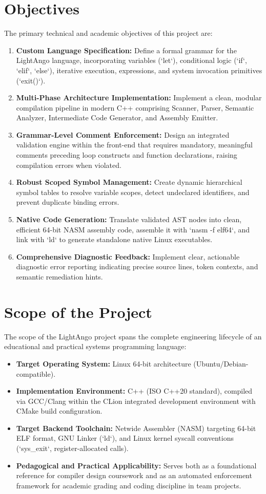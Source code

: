 \section{Objectives}
The primary technical and academic objectives of this project are:
\begin{enumerate}
    \item \textbf{Custom Language Specification:} Define a formal grammar for the LightAngo language, incorporating variables (`let`), conditional logic (`if`, `elif`, `else`), iterative execution, expressions, and system invocation primitives (`exit()`).
    \item \textbf{Multi-Phase Architecture Implementation:} Implement a clean, modular compilation pipeline in modern C++ comprising Scanner, Parser, Semantic Analyzer, Intermediate Code Generator, and Assembly Emitter.
    \item \textbf{Grammar-Level Comment Enforcement:} Design an integrated validation engine within the front-end that requires mandatory, meaningful comments preceding loop constructs and function declarations, raising compilation errors when violated.
    \item \textbf{Robust Scoped Symbol Management:} Create dynamic hierarchical symbol tables to resolve variable scopes, detect undeclared identifiers, and prevent duplicate binding errors.
    \item \textbf{Native Code Generation:} Translate validated AST nodes into clean, efficient 64-bit NASM assembly code, assemble it with `nasm -f elf64`, and link with `ld` to generate standalone native Linux executables.
    \item \textbf{Comprehensive Diagnostic Feedback:} Implement clear, actionable diagnostic error reporting indicating precise source lines, token contexts, and semantic remediation hints.
\end{enumerate}

\section{Scope of the Project}
The scope of the LightAngo project spans the complete engineering lifecycle of an educational and practical systems programming language:
\begin{itemize}
    \item \textbf{Target Operating System:} Linux 64-bit architecture (Ubuntu/Debian-compatible).
    \item \textbf{Implementation Environment:} C++ (ISO C++20 standard), compiled via GCC/Clang within the CLion integrated development environment with CMake build configuration.
    \item \textbf{Target Backend Toolchain:} Netwide Assembler (NASM) targeting 64-bit ELF format, GNU Linker (`ld`), and Linux kernel syscall conventions (`sys_exit`, register-allocated calls).
    \item \textbf{Pedagogical and Practical Applicability:} Serves both as a foundational reference for compiler design coursework and as an automated enforcement framework for academic grading and coding discipline in team projects.
\end{itemize}

